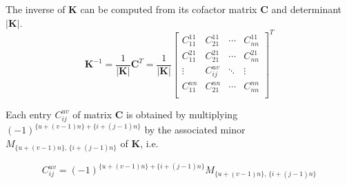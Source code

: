 \documentclass{article}
\begin{document}
The inverse of $\mathbf{K}$ can be computed from its cofactor matrix $\mathbf{C}$ and determinant $|\mathbf{K}|$.
\begin{equation}
\mathbf{K}^{-1}=\frac{1}{|\mathbf{K}|} \mathbf{C}^T=\frac{1}{|\mathbf{K}|}
\left[ \begin{array}{cccc}
C_{11}^{11} & C_{21}^{11} & \cdots & C_{nn}^{11} \\
C_{11}^{21} & C_{21}^{21} & \cdots & C_{nn}^{21} \\
\vdots & C_{ij}^{uv} & \ddots & \vdots \\
C_{11}^{nn} & C_{21}^{nn} & \cdots & C_{nn}^{nn} \\
\end{array} \right]^T
\end{equation}

Each entry $C_{ij}^{uv}$ of matrix $\mathbf{C}$ is obtained by multiplying $(-1)^{\{u+(v-1)n\}+\{i+(j-1)n\}}$ by the associated minor $M_{\{u+(v-1)n\},\,\{i+(j-1)n\}}$ of $\mathbf{K}$, i.e.

\begin{equation}
C_{ij}^{uv}=(-1)^{\{u+(v-1)n\}+\{i+(j-1)n\}}M_{\{u+(v-1)n\},\,\{i+(j-1)n\}}
\end{equation}
\end{document}

